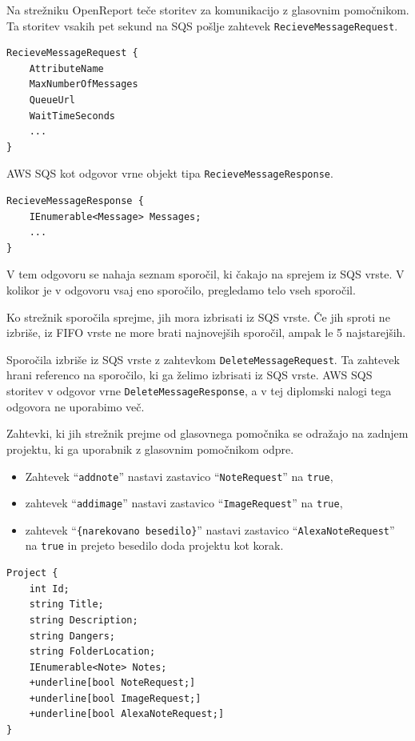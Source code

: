 \documentclass[a4paper, 12pt]{book}
\begin{document}
Na strežniku OpenReport teče storitev za komunikacijo z glasovnim pomočnikom.
Ta storitev vsakih pet sekund na SQS pošlje zahtevek \texttt{RecieveMessageRequest}.

\begin{Verbatim}[commandchars=+\[\]]
RecieveMessageRequest {
    AttributeName 
    MaxNumberOfMessages 
    QueueUrl 
    WaitTimeSeconds
    ... 
} 
\end{Verbatim}

AWS SQS kot odgovor vrne objekt tipa \texttt{RecieveMessageResponse}.

\begin{Verbatim}[commandchars=+\[\]]
RecieveMessageResponse {
    IEnumerable<Message> Messages;
    ...
}
\end{Verbatim}

V tem odgovoru se nahaja seznam sporočil, ki čakajo na sprejem iz SQS vrste.
V kolikor je v odgovoru vsaj eno sporočilo, pregledamo telo vseh sporočil. 

Ko strežnik sporočila sprejme, jih mora izbrisati iz SQS vrste.
Če jih sproti ne izbriše, iz FIFO vrste ne more brati najnovejših sporočil, ampak le 5 najstarejših.

Sporočila izbriše iz SQS vrste z zahtevkom \texttt{DeleteMessageRequest}.
Ta zahtevek hrani referenco na sporočilo, ki ga želimo izbrisati iz SQS vrste.
AWS SQS storitev v odgovor vrne \texttt{DeleteMessageResponse}, a v tej diplomski nalogi tega odgovora ne uporabimo več.

Zahtevki, ki jih strežnik prejme od glasovnega pomočnika se odražajo na zadnjem projektu, ki ga uporabnik z glasovnim pomočnikom odpre.
\begin{itemize}
	\item Zahtevek \enquote{\texttt{addnote}} nastavi zastavico \enquote{\texttt{NoteRequest}} na \texttt{true},
	\item zahtevek \enquote{\texttt{addimage}} nastavi zastavico \enquote{\texttt{ImageRequest}} na \texttt{true},
	\item zahtevek \enquote{\texttt{\{narekovano besedilo\}}} nastavi zastavico \enquote{\texttt{AlexaNoteRequest}} na \texttt{true} in prejeto besedilo doda projektu kot korak.
\end{itemize}

\begin{Verbatim}[commandchars=+\[\]]
Project { 
    int Id; 
    string Title; 
    string Description; 
    string Dangers; 
    string FolderLocation; 
    IEnumerable<Note> Notes; 
    +underline[bool NoteRequest;] 
    +underline[bool ImageRequest;] 
    +underline[bool AlexaNoteRequest;] 
}
\end{Verbatim}
\end{document}
